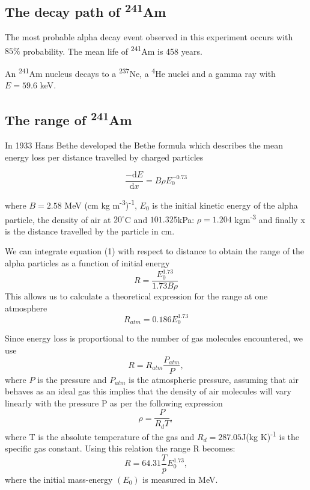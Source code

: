 \documentclass[a4paper]{article}
\begin{document}
\begin{multicols}{2}
\subsection{The decay path of \textsuperscript{241}Am}
The most probable alpha decay event observed in this experiment occurs with $85\%$ probability. The mean life of \textsuperscript{241}Am is 458 years\cite{SPA}.

An \textsuperscript{241}Am nucleus decays to a \textsuperscript{237}Ne, a \textsuperscript{4}He nuclei and a gamma ray with $E = 59.6$ keV\cite{americium}.
\subsection{The range of \textsuperscript{241}Am}
In 1933 Hans Bethe developed the Bethe formula which describes the mean energy loss per distance travelled by charged particles\cite{Bethe}

\begin{equation} \frac{-\mathrm{d} E}{\mathrm{d} x} = B \rho E_0^{- 0.73}
\end{equation}

where $B = 2.58$ MeV (cm kg m\textsuperscript{-3})\textsuperscript{-1}, $E_0$ is the initial kinetic energy of the alpha particle, the density of air at $20^{\circ}$C and $101.325 $kPa: $\rho = 1.204$ kgm\textsuperscript{-3} and finally x is the distance travelled by the particle in cm\cite{SPA}.

We can integrate equation (1) with respect to distance to obtain the range of the alpha particles as a function of initial energy
\begin{equation} R = \frac{E_0^{1.73}}{1.73 B \rho}
\end{equation}
This allows us to calculate a theoretical expression for the range at one atmosphere\cite{SPA}
\begin{equation} R_{atm} = 0.186 E_0^{1.73}
\end{equation}

Since energy loss is proportional to the number of gas molecules encountered\cite{SPA}, we use 
\begin{equation} R = R_{atm} \frac{P_{atm}}{P},
\end{equation}
where $P$ is the pressure and $P_{atm}$ is the atmospheric pressure, assuming that air behaves as an ideal gas this implies that the density of air molecules will vary linearly with the pressure P\cite{SPA} as per the following expression
\begin{equation} \rho = \frac{P}{R_d T},
\end{equation}
where T is the absolute temperature of the gas and $R_d = 287.05$J(kg K)\textsuperscript{-1} is the specific gas constant.
Using this relation the range R becomes:
\begin{equation} R = 64.31 \frac{T}{p} E_0^{1.73},
\end{equation}
where the initial mass-energy $(E_0)$ is measured in MeV\cite{SPA}. 


\end{multicols}
\end{document}
